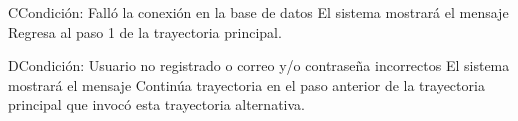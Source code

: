 	\begin{UCtrayectoriaA}{C}{Condición: Falló la conexión en la base de datos}
		\UCpaso[\UCsist] El sistema mostrará el mensaje 
		\UCpaso[\UCsist] Regresa al paso 1 de la trayectoria principal. 
	\end{UCtrayectoriaA}
		\begin{UCtrayectoriaA}{D}{Condición: Usuario no registrado o correo y/o contraseña incorrectos}
			\UCpaso[\UCsist] El sistema mostrará el mensaje 
			\UCpaso[\UCsist] Continúa trayectoria en el paso anterior de la trayectoria  principal que invocó esta trayectoria alternativa. 
	\end{UCtrayectoriaA}	
